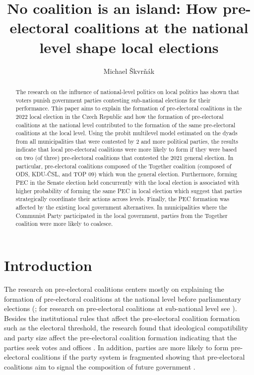 \documentclass[fignum,12pt,titlepage]{article}
\title{No coalition is an island: How pre-electoral coalitions at the national level shape local elections}
\author{Michael Škvrňák}
\begin{document}
\maketitle

\begin{abstract}
The research on the influence of national-level politics on local politics has shown that voters punish government parties contesting sub-national elections for their performance. This paper aims to explain the formation of pre-electoral coalitions in the 2022 local election in the Czech Republic and how the formation of pre-electoral coalitions at the national level contributed to the formation of the same pre-electoral coalitions at the local level. 
Using the probit multilevel model estimated on the dyads from all municipalities that were contested by 2 and more political parties, the results indicate that local pre-electoral coalitions were more likely to form if they were based on two (of three) pre-electoral coalitions that contested the 2021 general election. In particular, pre-electoral coalitions composed of the Together coalition (composed of ODS, KDU-ČSL, and TOP 09) which won the general election. Furthermore, forming PEC in the Senate election held concurrently with the local election is associated with higher probability of forming the same PEC in local election which suggest that parties strategically coordinate their actions across levels. Finally, the PEC formation was affected by the existing local government alternatives. In municipalities where the Communist Party participated in the local government, parties from the Together coalition were more likely to coalesce. 
\end{abstract}

\section{Introduction}

The research on pre-electoral coalitions centers mostly on explaining the formation of pre-electoral coalitions at the national level before parliamentary elections (\cite{golder2005,golder2006,golder2006b,ibenskas2016,ibenskas2020,haugsgjerd2009,magyar2022}; for research on pre-electoral coalitions at sub-national level see \cite{hendrawan2021,silva2022}). Besides the institutional rules that affect the pre-electoral coalition formation such as the electoral threshold, the research found that ideological compatibility and party size affect the pre-electoral coalition formation indicating that the parties seek votes and offices \parencite{ibenskas2016,golder2006,magyar2022}. 
In addition, parties are more likely to form pre-electoral coalitions if the party system is fragmented showing that pre-electoral coalitions aim to signal the composition of future government \parencite{golder2005}.  
\end{document}
